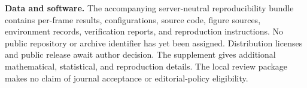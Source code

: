 \documentclass[10pt,a4paper,twocolumn]{article}
\begin{document}
\textbf{Data and software.} The accompanying server-neutral reproducibility bundle contains per-frame results, configurations, source code, figure sources, environment records, verification reports, and reproduction instructions. No public repository or archive identifier has yet been assigned. Distribution licenses and public release await author decision. The supplement gives additional mathematical, statistical, and reproduction details. The local review package makes no claim of journal acceptance or editorial-policy eligibility.



\end{document}
